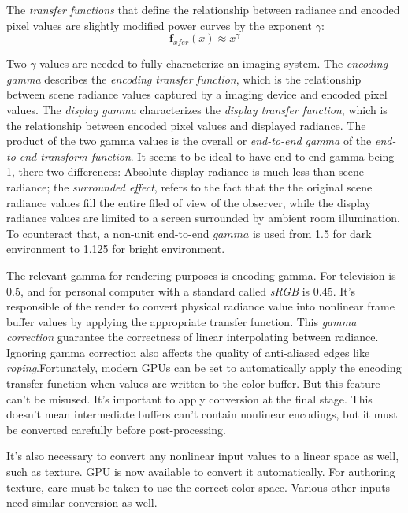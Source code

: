 \documentclass[10pt, a4paper]{article}
\begin{document}
            The \emph{transfer functions} that define the relationship between radiance and encoded pixel values are slightly modified power curves by the exponent $\gamma$:
                $$\textbf{f}_{xfer}(x) \approx x^{\gamma}$$
            
            Two $\gamma$ values are needed to fully characterize an imaging system. The \emph{encoding gamma} describes the \emph{encoding transfer function}, which is the relationship between scene radiance values captured by a imaging device and encoded pixel values. The \emph{display gamma} characterizes the \emph{display transfer function}, which is the relationship between encoded pixel values and displayed radiance. The product of the two gamma values is the overall or \emph{end-to-end gamma} of the \emph{end-to-end transform function}. It seems to be ideal to have end-to-end gamma being 1, there two differences: Absolute display radiance is much less than scene radiance; the \emph{surrounded effect}, refers to the fact that the the original scene radiance values fill the entire filed of view of the observer, while the display radiance values are limited to a screen surrounded by ambient room illumination. To counteract that, a non-unit end-to-end $gamma$ is used from 1.5 for dark environment to 1.125 for bright environment. 

            The relevant gamma for rendering purposes is encoding gamma. For television is 0.5, and for personal computer with a standard called \emph{sRGB} is 0.45. It's responsible of the render to convert physical radiance value into nonlinear frame buffer values by applying the appropriate transfer function. This \emph{gamma correction} guarantee the correctness of linear interpolating between radiance. Ignoring gamma correction also affects the quality of anti-aliased edges like \emph{roping}.Fortunately, modern GPUs can be set to automatically apply the encoding transfer function when values are written to the color buffer. But this feature can't be misused. It's important to apply conversion at the final stage. This doesn't mean intermediate buffers can't contain nonlinear encodings, but it must be converted carefully before post-processing. 
            
            It's also necessary to convert any nonlinear input values to a linear space as well, such as texture. GPU is now available to convert it automatically. For authoring texture, care must be taken to use the correct color space. Various other inputs need similar conversion as well.
            \newpage
    
\end{document}
